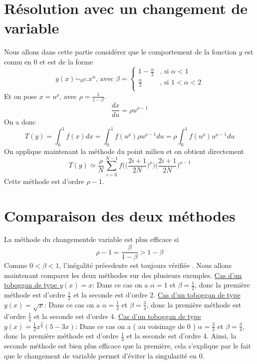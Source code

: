 \documentclass[a4paper,10pt]{article}
\begin{document}
\section{R\'esolution avec un changement de variable}
Nous allons dans cette partie consid\'erer que le comportement de la fonction $y$ est connu en 0 et est de la forme
\begin{equation}
 y(x)\sim_0 c.x^{\alpha} \text{, avec } \beta = \begin{cases}
						    1 - \frac{\alpha}{2} &\text{, si }\alpha < 1\\
						    \frac{\alpha}{2}	 &\text{, si } 1 < \alpha < 2\\
						 \end{cases}
\end{equation}
Et on pose $x = u^\rho$, avec $\rho = \frac{1}{1 - \beta}$.
\begin{equation}
 \frac{dx}{du} = \rho u^{\rho - 1}
\end{equation}
On a donc
\begin{equation}
 T(y) = \int_0^1f(x)dx = \int_0^1f(u^\rho)\rho u^{\rho - 1} du = \rho \int_0^1f(u^\rho) u^{\rho - 1} du
\end{equation}
On applique maintenant la m\'ethode du point milieu et on obtient directement 
\begin{equation}
 T(y) \simeq \frac{\rho}{N}\sum_{i=0}^{N-1}f\Bigg(\Big(\frac{2i + 1}{2N}\Big)^{\rho}\Bigg)\Big(\frac{2i + 1}{2N}\Big)^{\rho - 1}
\end{equation}
Cette m\'ethode est d'ordre $\rho - 1$.
\section{Comparaison des deux m\'ethodes}
La m\'ethode du changementde variable est plus efficace si 
\begin{equation}
 \rho - 1 = \frac{\beta}{1-\beta} > 1 - \beta
\end{equation}
Comme $0 < \beta < 1$, l'in\'egalit\'e pr\'ecedente est toujours v\'erifi\'ee . Nous allons maintenant comparer les deux m\'ethodes sur des plusieurs exemples.
\newline
\underline{Cas d'un toboggan de type $y(x) = x$}: Dans ce cas on a $\alpha = 1$ et $\beta = \frac{1}{2}$, donc la premi\`ere m\'ethode est d'ordre $\frac{1}{2}$ et la seconde est d'ordre 2. 
\newline
\underline{Cas d'un toboggan de type $y(x) = \sqrt{x}$}: Dans ce cas on a $\alpha = \frac{1}{2}$ et $\beta = \frac{3}{4}$, donc la premi\`ere m\'ethode est d'ordre $\frac{1}{4}$ et la seconde est d'ordre 4.
\newline
\underline{Cas d'un toboggan de type $y(x) = \frac{1}{2}x^{\frac{3}{2}}(5-3x)$}: Dans ce cas on a ( au voisinage de 0 ) $\alpha = \frac{3}{2}$ et $\beta = \frac{3}{4}$, donc la premi\`ere m\'ethode est d'ordre $\frac{1}{4}$ et la seconde est d'ordre 4.
\newline
Ainsi, la seconde m\'ethode est bien plus efficace que la premi\`ere, cela s'explique par le fait que le changement de variable permet d'\'eviter la singularit\'e en 0.
\end{document}
